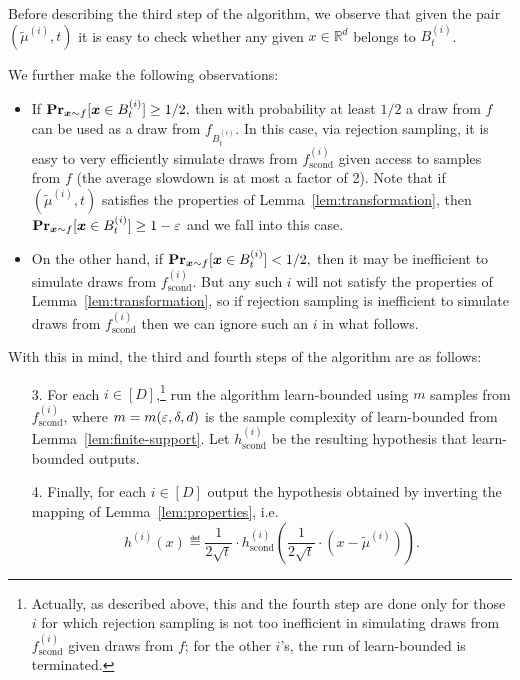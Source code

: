 Before describing the third step of the algorithm, we observe that given the pair $(\tilde{\mu}^{(i)},t)$ it is easy to check whether any given $x \in \mathbb{R}^d$ belongs to $B_{t}^{(i)}$. We further make the following observations:

\begin{itemize}


\item If $\operatorname{{\bf Pr}}_{\boldsymbol{x} \sim f}[\boldsymbol{x} \in B_{t}^{(i)}] \geq 1/2,$ then with probability at least $1/2$ a draw from $f$ can be used as a draw from $f_{B_{t}^{(i)}}$.  In this case, via rejection sampling, it is easy to very efficiently simulate draws from $f^{(i)}_{\mathrm{scond}}$ given access to samples from $f$ (the average slowdown is at most a factor of 2).  Note that if $(\tilde{\mu}^{(i)},t)$ satisfies the properties of Lemma~\ref{lem:transformation}, then $\operatorname{{\bf Pr}}_{\boldsymbol{x} \sim f}[\boldsymbol{x} \in B_{t}^{(i)}] \geq 1-\varepsilon$ and we fall into this case.

\item On the other hand, if $\operatorname{{\bf Pr}}_{\boldsymbol{x} \sim f}[\boldsymbol{x} \in B_{t}^{(i)}] < 1/2,$ then it may be inefficient to simulate draws from $f^{(i)}_{\mathrm{scond}}.$  But any such $i$ will not satisfy the properties of Lemma~\ref{lem:transformation}, so if rejection sampling is inefficient to simulate draws from $f^{(i)}_{\mathrm{scond}}$ then we can ignore such an $i$ in what follows.

\end{itemize}

With this in mind, the third and fourth steps of the algorithm are as follows:
    
\begin{enumerate}

\item [3.] For each $i \in [D]$,\footnote{Actually, as described above, this and the fourth step are done only for those $i$ for which rejection sampling is not too inefficient in simulating draws from $f^{(i)}_{\mathrm{scond}}$ given draws from $f$; for the other $i$'s, the run of \textsf{learn-bounded} is terminated.} run the algorithm \textsf{learn-bounded} using $m$  samples from $f^{(i)}_{\mathrm{scond}}$, where $m=m(\varepsilon,\delta,d)$ is the sample complexity of \textsf{learn-bounded} from Lemma~\ref{lem:finite-support}.
 Let ${h}_{\mathrm{scond}}^{(i)}$ be the resulting hypothesis that \textsf{learn-bounded} outputs.

\item [4.] Finally, for each $i \in [D]$ output the hypothesis obtained by 
inverting the mapping of Lemma~\ref{lem:properties}, i.e.
\begin{equation} \label{eq:hi}
{h}^{(i)}(x) \eqdef
{\frac 1 {2\sqrt{t}}} \cdot {h}_{\mathrm{scond}}^{(i)}\left(
{\frac 1 {2\sqrt{t}}} \cdot (x-\tilde{\mu}^{(i)})  \right).
\end{equation}
\end{enumerate} 


